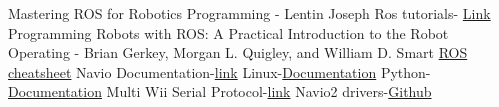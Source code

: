\documentclass[a4paper,12pt,oneside]{book}
\begin{document}
\begin{thebibliography}{li}
Mastering ROS for Robotics Programming - Lentin Joseph
Ros tutorials-
\href{http://wiki.ros.org/ROS/Tutorials}{Link}
Programming Robots with ROS: A Practical Introduction to the Robot
Operating - Brian Gerkey, Morgan L. Quigley, and William D. Smart
\href{http://www.tedusar.eu/files/summerschool2013/ROScheatsheet.pdf}{ROS cheatsheet}
Navio Documentation-\href{https://docs.emlid.com/navio2/}{link}
Linux-\href{https://ryanstutorials.net/linuxtutorial/}{Documentation}
Python-\href{https://www.tutorialspoint.com/python/}{Documentation}
Multi Wii Serial Protocol-\href{http://www.multiwii.com/wiki/index.php?title=Multiwii_Serial_Protocol}{link}
Navio2 drivers-\href{https://github.com/emlid/Navio2}{Github}
\end{thebibliography}
\end{document}
